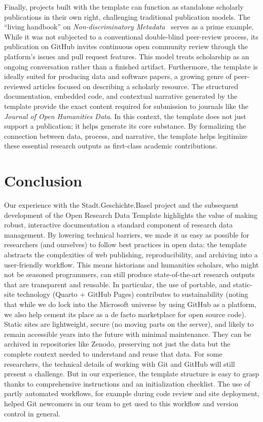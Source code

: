 \documentclass[final]{anthology-ch} %
\begin{document}
Finally, projects built with the template can function as standalone scholarly publications in their own right, challenging traditional publication models. The ``living handbook'' on \emph{Non-discri\-mi\-na\-tory Metadata}~\cite{maehr2024d} serves as a prime example. While it was not subjected to a conventional double-blind peer-review process, its publication on GitHub invites continuous open community review through the platform's issues and pull request features. This model treats scholarship as an ongoing conversation rather than a finished artifact. Furthermore, the template is ideally suited for producing data and software papers, a growing genre of peer-reviewed articles focused on describing a scholarly resource. The structured documentation, embedded code, and contextual narrative generated by the template provide the exact content required for submission to journals like the \emph{Journal of Open Humanities Data}. In this context, the template does not just support a publication; it helps generate its core substance. By formalizing the connection between data, process, and narrative, the template helps legitimize these essential research outputs as first-class academic contributions.

\section{Conclusion}\label{conclusion}

Our experience with the Stadt.Geschichte.Basel project and the subsequent development of the Open Research Data Template highlights the value of making robust, interactive documentation a standard component of research data management. By lowering technical barriers, we made it as easy as possible for researchers (and ourselves) to follow best practices in open data: the template abstracts the complexities of web publishing, reproducibility, and archiving into a user-friendly workflow. This means historians and humanities scholars, who might not be seasoned programmers, can still produce state-of-the-art research outputs that are transparent and reusable. In particular, the use of portable, and static-site technology (Quarto + GitHub Pages) contributes to sustainability (noting that while we do lock into the Microsoft universe by using GitHub as a platform, we also help cement its place as a de facto marketplace for open source code). Static sites are lightweight, secure (no moving parts on the server), and likely to remain accessible years into the future with minimal maintenance. They can be archived in repositories like Zenodo, preserving not just the data but the complete context needed to understand and reuse that data. For some researchers, the technical details of working with Git and GitHub will still present a challenge. But in our experience, the template structure is easy to grasp thanks to comprehensive instructions and an initialization checklist. The use of partly automated workflows, for example during code review and site deployment, helped Git newcomers in our team to get used to this workflow and version control in general.
\end{document}

